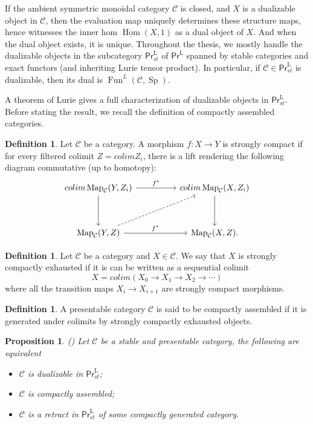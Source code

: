 \documentclass{article}
\newtheorem{prop}[thm]{Proposition}
\theoremstyle{definition}
\newtheorem{defn}[thm]{Definition}
\newcommand{\on}{\operatorname}
\newcommand{\PrL}{\mathsf{Pr}^\mathrm{L} }
\begin{document}
If the ambient symmetric monoidal category $\mathcal{C}$ is closed, and $X$ is a dualizable object in $\mathcal{C}$, then the evaluation map uniquely determines these structure maps, hence witnesses the inner hom $\underline{\on{Hom}}(X, 1)$ as a dual object of $X$. And when the dual object exists, it is unique. Throughout the thesis, we mostly handle the dualizable objects in the subcategory $\PrL_{st}$ of $\PrL$ spanned by stable categories and exact functors (and inheriting Lurie tensor product). In particular, if $\mathcal{C}\in\PrL_{st}$ is dualizable, then its dual is $\on{Fun}^L(\mathcal{C},\on{Sp})$.


A theorem of Lurie gives a full characterization of dualizable objects in $\PrL_{st}$. Before stating the result, we recall the definition of compactly assembled categories.
\begin{defn}
Let $\mathcal{C}$ be a category. A morphism $f: X\rightarrow Y$ is strongly compact if for every filtered colimit $Z=colim Z_i$, there is a lift rendering the following diagram commutative (up to homotopy):
\[\begin{tikzcd}
	{colim\on{Map}_{\mathcal{C}}(Y,Z_i)} && {colim\on{Map}_{\mathcal{C}}(X,Z_i)} \\
	\\
	{\on{Map}_{\mathcal{C}}(Y,Z)} && {\on{Map}_{\mathcal{C}}(X,Z)}
	\arrow["{f^\ast}", from=1-1, to=1-3]
	\arrow[from=1-1, to=3-1]
	\arrow[from=1-3, to=3-3]
	\arrow[dashed, from=3-1, to=1-3]
	\arrow["{f^\ast}", from=3-1, to=3-3].
\end{tikzcd}\]
\end{defn}
\begin{defn}
Let $\mathcal{C}$ be a category and $X\in\mathcal{C}$. We say that $X$ is strongly compactly exhausted if it is can be written as a sequential colimit\[
X=colim (X_0\rightarrow X_1\rightarrow X_2\rightarrow\cdots)\]
where all the transition maps $X_i\rightarrow X_{i+1}$ are strongly compact morphisms.
\end{defn}
\begin{defn}
A presentable category $\mathcal{C}$ is said to be compactly assembled if it is generated under colimits by strongly compactly exhausted objects.
\end{defn}
\begin{prop}(\cite[Proposition D.7.3.1]{SAG})
Let $\mathcal{C}$ be a stable and presentable category, the following are equivalent 
\begin{itemize}
\item $\mathcal{C}$ is dualizable in $\PrL_{st}$;
\item $\mathcal{C}$ is compactly assembled;
\item $\mathcal{C}$ is a retract in $\PrL_{st}$ of some compactly generated category.
\end{itemize}
\end{prop}
\end{document}
